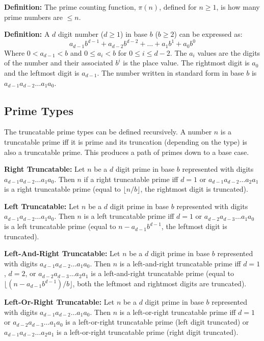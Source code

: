 \documentclass[12pt]{article}
\begin{document}
\textbf{Definition:} The prime counting function, $\pi(n)$, defined for $n\geq1$, is how many prime numbers are $\leq n$.

\textbf{Definition:} A $d$ digit number ($d\geq1$) in base $b$ ($b\geq2$) can be expressed as:
$$ a_{d-1}b^{d-1} + a_{d-2}b^{d-2} + \ldots + a_1b^1 + a_0b^0 $$
Where $0<a_{d-1}<b$ and $0\leq a_i<b$ for $0\leq i\leq d-2$. The $a_i$ values are the digits of the number and their associated $b^i$ is the place value. The rightmost digit is $a_0$ and the leftmost digit is $a_{d-1}$. The number written in standard form in base $b$ is $a_{d-1}a_{d-2}\ldots a_1a_0$.

\subsection{Prime Types}

The truncatable prime types can be defined recursively. A number $n$ is a truncatable prime iff it is prime and its truncation (depending on the type) is also a truncatable prime. This produces a path of primes down to a base case.

\textbf{Right Truncatable:} Let $n$ be a $d$ digit prime in base $b$ represented with digits $a_{d-1}a_{d-2}\ldots a_1a_0$. Then $n$ if a right truncatable prime iff $d=1$ or $a_{d-1}a_{d-2}\ldots a_2a_1$ is a right truncatable prime (equal to $\lfloor n/b\rfloor$, the rightmost digit is truncated).

\textbf{Left Truncatable:} Let $n$ be a $d$ digit prime in base $b$ represented with digits $a_{d-1}a_{d-2}\ldots a_1a_0$. Then $n$ is a left truncatable prime iff $d=1$ or $a_{d-2}a_{d-3}\ldots a_1a_0$ is a left truncatable prime (equal to $n-a_{d-1}b^{d-1}$, the leftmost digit is truncated).

\textbf{Left-And-Right Truncatable:} Let $n$ be a $d$ digit prime in base $b$ represented with digits $a_{d-1}a_{d-2}\ldots a_1a_0$. Then $n$ is a left-and-right truncatable prime iff $d=1$, $d=2$, or $a_{d-2}a_{d-3}\ldots a_2a_1$ is a left-and-right truncatable prime (equal to $\lfloor(n-a_{d-1}b^{d-1})/b\rfloor$, both the leftmost and rightmost digits are truncated).

\textbf{Left-Or-Right Truncatable:} Let $n$ be a $d$ digit prime in base $b$ represented with digits $a_{d-1}a_{d-2}\ldots a_1a_0$. Then $n$ is a left-or-right truncatable prime iff $d=1$ or $a_{d-2}a_{d-3}\ldots a_1a_0$ is a left-or-right truncatable prime (left digit truncated) or $a_{d-1}a_{d-2}\ldots a_2a_1$ is a left-or-right truncatable prime (right digit truncated).
\end{document}
